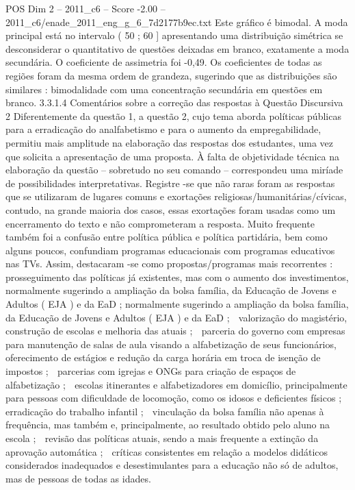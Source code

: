 \begin{textsample}{POS Dim 2 – 2011\_c6 – Score -2.00 – 2011\_c6/enade\_2011\_eng\_g\_6\_7d2177b9ec.txt}
Este gráfico é bimodal.
A moda principal está no intervalo ( 50 ; 60 ] apresentando uma distribuição simétrica se desconsiderar o quantitativo de questões deixadas em branco, exatamente a moda secundária.
O coeficiente de assimetria foi -0,49.
Os coeficientes de todas as regiões foram da mesma ordem de grandeza, sugerindo que as distribuições são similares : bimodalidade com uma concentração secundária em questões em branco. 3.3.1.4 Comentários sobre a correção das respostas à Questão Discursiva 2 Diferentemente da questão 1, a questão 2, cujo tema aborda políticas públicas para a erradicação do analfabetismo e para o aumento da empregabilidade, permitiu mais amplitude na elaboração das respostas dos estudantes, uma vez que solicita a apresentação de uma proposta.
À falta de objetividade técnica na elaboração da questão – sobretudo no seu comando – correspondeu uma miríade de possibilidades interpretativas.
Registre -se que não raras foram as respostas que se utilizaram de lugares comuns e exortações religiosas/humanitárias/cívicas, contudo, na grande maioria dos casos, essas exortações foram usadas como um encerramento do texto e não comprometeram a resposta.
Muito frequente também foi a confusão entre política pública e política partidária, bem como alguns poucos, confundiam programas educacionais com programas educativos nas TVs.
Assim, destacaram -se como propostas/programas mais recorrentes :  prosseguimento das políticas já existentes, mas com o aumento dos investimentos, normalmente sugerindo a ampliação da bolsa família, da Educação de Jovens e Adultos ( EJA ) e da EaD ; normalmente sugerindo a ampliação da bolsa família, da Educação de Jovens e Adultos ( EJA ) e da EaD ;  valorização do magistério, construção de escolas e melhoria das atuais ;  parceria do governo com empresas para manutenção de salas de aula visando a alfabetização de seus funcionários, oferecimento de estágios e redução da carga horária em troca de isenção de impostos ;  parcerias com igrejas e ONGs para criação de espaços de alfabetização ;  escolas itinerantes e alfabetizadores em domicílio, principalmente para pessoas com dificuldade de locomoção, como os idosos e deficientes físicos ;  erradicação do trabalho infantil ;  vinculação da bolsa família não apenas à frequência, mas também e, principalmente, ao resultado obtido pelo aluno na escola ;  revisão das políticas atuais, sendo a mais frequente a extinção da aprovação automática ;  críticas consistentes em relação a modelos didáticos considerados inadequados e desestimulantes para a educação não só de adultos, mas de pessoas de todas as idades.

\end{textsample}
